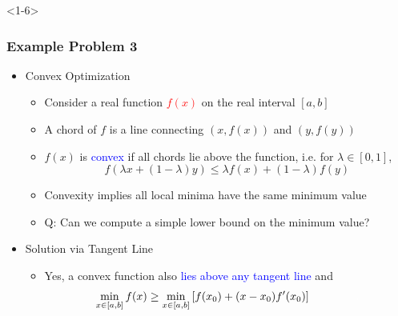 \documentclass[10pt,english,aspectratio=169]{beamer}
\begin{document}
\begin{frame}<1-6> \frametitle{Example Problem 3}

\begin{itemize}
\item<1-> Convex Optimization \vspace{1mm}

\begin{itemize}
  \setlength\itemsep{3mm}
  \item<1-> Consider a real function \textcolor{red}{$f(x)$} on the real interval $[a,b]$

  
  \item<2-> A \textcolor{green!50!black}{chord} of $f$ is a line connecting $(x,f(x))$ and $(y,f(y))$
  
  \item<3-> $f(x)$ is \textcolor{blue}{convex} if all chords lie above the function, i.e. for $\lambda \in [0,1]$, \[ f(\lambda x +(1-\lambda) y) \leq \lambda f(x) + (1-\lambda) f(y) \] 
   
  \item<4-> Convexity implies all local minima have the same \textcolor{purple!50!blue}{minimum value}  \vspace{-1mm}
  
  \item<5->[] \begin{tcolorbox}[colback=yellow!15] Q: Can we compute a simple lower bound on the minimum value?   \end{tcolorbox}

\vspace{2mm}

\end{itemize}

\item <6-> Solution via Tangent Line \vspace{1mm}

\begin{itemize}
  \setlength\itemsep{3mm}
  \item<6-> Yes, a convex function also \textcolor{blue}{lies above any tangent line} and
  \[ \min_{x\in [a,b]} f(x) \geq \min_{x\in [a,b]} \left[ f(x_0)+(x-x_0) f'(x_0) \right] \quad\quad\quad\quad \textcolor{white}{.}\]
\end{itemize}
  
\end{itemize}





\end{frame}
\end{document}
